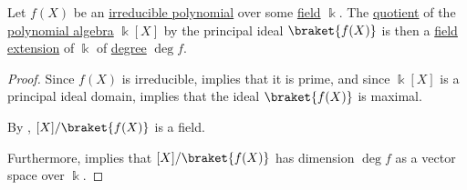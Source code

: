 \begin{lemma}\label{thm:quotient_by_irreducible_polynomial}
  Let \( f(X) \) be an \hyperref[def:domain_divisibility/irreducible]{irreducible polynomial} over some \hyperref[def:field]{field} \( \Bbbk \). The \hyperref[def:algebra_over_ring/quotient]{quotient} of the \hyperref[def:polynomial_algebra]{polynomial algebra} \( \Bbbk[X] \) by the principal ideal \( \braket{ f(X) } \) is then a \hyperref[def:field/submodel]{field extension} of \( \Bbbk \) of \hyperref[def:field_extension_degree]{degree} \( \deg f \).
\end{lemma}
\begin{proof}
  Since \( f(X) \) is irreducible,  implies that it is prime, and since \( \Bbbk[X] \) is a principal ideal domain,  implies that the ideal \( \braket{ f(X) } \) is maximal.

  By , \( \Bbbk[X] / \braket{ f(X) } \) is a field.

  Furthermore,  implies that \( \Bbbk[X] / \braket{ f(X) } \) has dimension \( \deg f \) as a vector space over \( \Bbbk \).
\end{proof}

